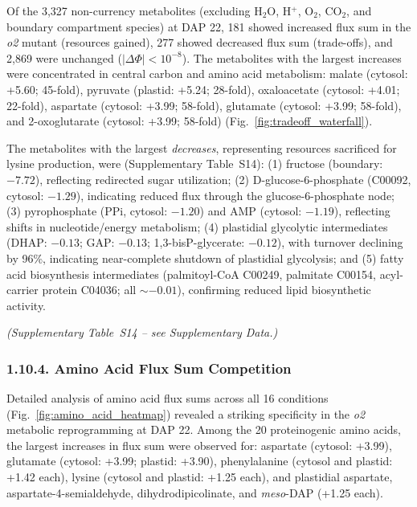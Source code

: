 \documentclass[12pt,a4paper]{article}
\begin{document}
Of the 3,327 non-currency metabolites (excluding H$_2$O, H$^+$, O$_2$, CO$_2$, and boundary compartment species) at DAP 22, 181 showed increased flux sum in the \textit{o2} mutant (resources gained), 277 showed decreased flux sum (trade-offs), and 2,869 were unchanged ($|\Delta\Phi| < 10^{-8}$). The metabolites with the largest increases were concentrated in central carbon and amino acid metabolism: malate (cytosol: +5.60; 45-fold), pyruvate (plastid: +5.24; 28-fold), oxaloacetate (cytosol: +4.01; 22-fold), aspartate (cytosol: +3.99; 58-fold), glutamate (cytosol: +3.99; 58-fold), and 2-oxoglutarate (cytosol: +3.99; 58-fold) (Fig.~\ref{fig:tradeoff_waterfall}).

The metabolites with the largest \textit{decreases}, representing resources sacrificed for lysine production, were (Supplementary Table~S14): (1) fructose (boundary: $-7.72$), reflecting redirected sugar utilization; (2) D-glucose-6-phosphate (C00092, cytosol: $-1.29$), indicating reduced flux through the glucose-6-phosphate node; (3) pyrophosphate (PPi, cytosol: $-1.20$) and AMP (cytosol: $-1.19$), reflecting shifts in nucleotide/energy metabolism; (4) plastidial glycolytic intermediates (DHAP: $-0.13$; GAP: $-0.13$; 1,3-bisP-glycerate: $-0.12$), with turnover declining by 96\%, indicating near-complete shutdown of plastidial glycolysis; and (5) fatty acid biosynthesis intermediates (palmitoyl-CoA C00249, palmitate C00154, acyl-carrier protein C04036; all $\sim -0.01$), confirming reduced lipid biosynthetic activity.


\noindent\textit{(Supplementary Table~S14 -- see Supplementary Data.)}


\subsubsection{1.10.4. Amino Acid Flux Sum Competition}

Detailed analysis of amino acid flux sums across all 16 conditions (Fig.~\ref{fig:amino_acid_heatmap}) revealed a striking specificity in the \textit{o2} metabolic reprogramming at DAP 22. Among the 20 proteinogenic amino acids, the largest increases in flux sum were observed for: aspartate (cytosol: +3.99), glutamate (cytosol: +3.99; plastid: +3.90), phenylalanine (cytosol and plastid: +1.42 each), lysine (cytosol and plastid: +1.25 each), and plastidial aspartate, aspartate-4-semialdehyde, dihydrodipicolinate, and \textit{meso}-DAP (+1.25 each).
\end{document}
